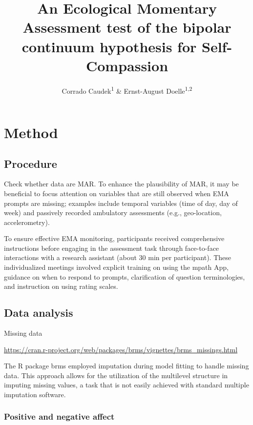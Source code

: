 \documentclass[
  man,floatsintext]{apa6}
\title{An Ecological Momentary Assessment test of the bipolar continuum hypothesis for Self-Compassion}
\author{Corrado Caudek\textsuperscript{1} \& Ernst-August Doelle\textsuperscript{1,2}}
\date{}
\affiliation{\vspace{0.5cm}\textsuperscript{1} Wilhelm-Wundt-University\\\textsuperscript{2} Konstanz Business School}
\begin{document}
\maketitle

\hypertarget{method}{%
\section{Method}\label{method}}

\hypertarget{procedure}{%
\subsection{Procedure}\label{procedure}}

Check whether data are MAR. To enhance the plausibility of MAR, it may be beneficial to focus attention on variables that are still observed when EMA prompts are missing; examples include temporal variables (time of day, day of week) and passively recorded ambulatory assessments (e.g., geo-location, accelerometry).

To ensure effective EMA monitoring, participants received comprehensive instructions before engaging in the assessment task through face-to-face interactions with a research assistant (about 30 min per participant). These individualized meetings involved explicit training on using the mpath App, guidance on when to respond to prompts, clarification of question terminologies, and instruction on using rating scales.

\hypertarget{data-analysis}{%
\subsection{Data analysis}\label{data-analysis}}

Missing data

\url{https://cran.r-project.org/web/packages/brms/vignettes/brms_missings.html}

The R package brms employed imputation during model fitting to handle missing data. This approach allows for the utilization of the multilevel structure in imputing missing values, a task that is not easily achieved with standard multiple imputation software.

\hypertarget{positive-and-negative-affect}{%
\subsubsection{Positive and negative affect}\label{positive-and-negative-affect}}
\end{document}
